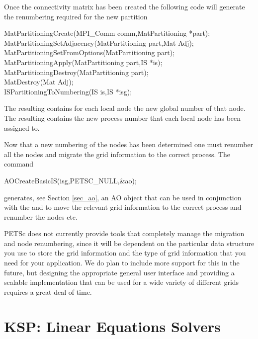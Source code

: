 Once the connectivity matrix has been created the following code will generate the 
renumbering required for the new partition
\begin{tabbing}
 MatPartitioningCreate(MPI\_Comm comm,MatPartitioning *part);\\
 MatPartitioningSetAdjacency(MatPartitioning part,Mat Adj);\\
 MatPartitioningSetFromOptions(MatPartitioning part);\\
 MatPartitioningApply(MatPartitioning part,IS *is);\\
 MatPartitioningDestroy(MatPartitioning part); \\
 MatDestroy(Mat Adj);\\
 ISPartitioningToNumbering(IS is,IS *isg);
\end{tabbing}
The   
  
  resulting  contains for each local node the new global
number of that node. The resulting  contains the new process number
that each local node has been assigned to.

Now that a new numbering of the nodes has been determined one must 
renumber all the nodes and migrate the grid information to the correct process.
The command
\begin{tabbing}
 AOCreateBasicIS(isg,PETSC\_NULL,\&ao);
\end{tabbing}
generates, see Section \ref{sec_ao}, an AO object that can be used in conjunction with the
 and  to move the relevant grid information to the correct process
and renumber the nodes etc. 

PETSc does not currently provide tools that completely manage the migration and 
node renumbering, since it will be dependent on the particular data structure you 
use to store the grid information and the type of grid information that you need
for your application. We do plan to include more support for this in the future,
but designing the appropriate general user interface and providing a scalable
implementation that can be used for a wide variety of different grids requires a
great deal of time.

 


\cleardoublepage
\chapter{KSP: Linear Equations Solvers} 
\label{ch_ksp}

